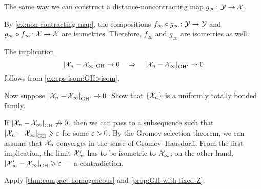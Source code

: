 The same way we can construct a distance-noncontracting map 
$g_\infty\colon\mathcal{Y}\to \mathcal{X}$.

By \ref{ex:non-contracting-map}, the compositions $f_\infty\circ g_\infty\colon\mathcal{Y}\to \mathcal{Y}$ and $g_\infty\z\circ f_\infty\:\spc{X}\to \spc{X}$ are isometries.
Therefore, $f_\infty$ and $g_\infty$ are isometries as well.

 The implication 
\[|\spc{X}_n-\spc{X}_\infty|_{\GH}\to 0 
\quad\Rightarrow\quad 
\dist{\spc{X}_n}{\spc{X}_\infty}{\GH'}\to 0\]
follows from \ref{ex:eps-isom:GH>isom}. 

Now suppose $\dist{\spc{X}_n}{\spc{X}_\infty}{\GH'}\to 0$.
Show that $\{\mathcal{X}_n\}$ is a uniformly totally bonded family.

If $\dist{\spc{X}_n}{\spc{X}_\infty}{\GH}\not\to 0$, then we can pass to a subsequence such that $\dist{\spc{X}_n}{\spc{X}_\infty}{\GH}\ge\eps$ for some $\varepsilon>0$.
By the Gromov selection theorem, we can assume that $\mathcal{X}_n$ converges in the sense of Gromov--Hausdorff.
From the first implication, the limit $\mathcal{X}_\infty'$ has to be isometric to $\mathcal{X}_\infty$;
on the other hand, $\dist{\spc{X}_\infty'}{\spc{X}_\infty}{\GH}\ge \eps$ --- a contradiction.

Apply \ref{thm:compact-homogeneous} and \ref{prop:GH-with-fixed-Z}.

